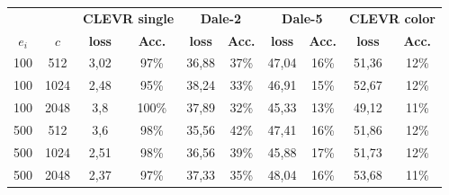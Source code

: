 \begin{table}[ht]
    \centering
    \begin{tabular}{cc|cc|cc|cc|cc}
        \toprule
               &        & \multicolumn{2}{c}{\textbf{CLEVR single}} & \multicolumn{2}{c}{\textbf{Dale-2}} & \multicolumn{2}{c}{\textbf{Dale-5}} & \multicolumn{2}{c}{\textbf{CLEVR color}}                                                                 \\  \cmidrule(lr){3-4}\cmidrule(lr){5-6}\cmidrule(lr){7-8}\cmidrule(lr){9-10}
        $e_i$  & $c$    & \textbf{loss}                             & \textbf{Acc.}                       & \textbf{loss}                       & \textbf{Acc.}                            & \textbf{loss} & \textbf{Acc.} & \textbf{loss} & \textbf{Acc.} \\\midrule
        {100}  & {512}  & {3,02}                                    & {97\%}                              & {36,88}                             & {37\%}                                   & {47,04}       & {16\%}        & {51,36}       & {12\%}        \\
        {100}  & {1024} & {2,48}                                    & {95\%}                              & {38,24}                             & {33\%}                                   & {46,91}       & {15\%}        & {52,67}       & {12\%}        \\
        {100}  & {2048} & {3,8}                                     & {100\%}                             & {37,89}                             & {32\%}                                   & {45,33}       & {13\%}        & {49,12}       & {11\%}        \\
        {500}  & {512}  & {3,6}                                     & {98\%}                              & {35,56}                             & {42\%}                                   & {47,41}       & {16\%}        & {51,86}       & {12\%}        \\
        {500}  & {1024} & {2,51}                                    & {98\%}                              & {36,56}                             & {39\%}                                   & {45,88}       & {17\%}        & {51,73}       & {12\%}        \\
        {500}  & {2048} & {2,37}                                    & {97\%}                              & {37,33}                             & {35\%}                                   & {48,04}       & {16\%}        & {53,68}       & {11\%}        \\

\end{tabular}
\end{table}
